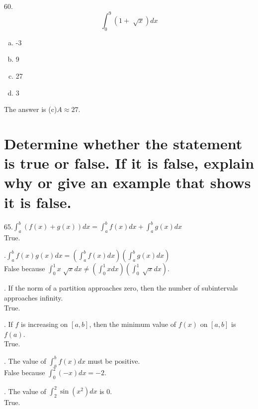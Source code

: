 \documentclass[11pt]{article}
\newcommand*{\vs}{\vspace{1cm}}
\newcommand*{\next}{\noindent}
\begin{document}
60.\[\int_{0}^{9}(1+\sqrt[]{x})dx\]
\begin{enumerate}[(a)]
    \item -3
    \item 9
    \item 27
    \item 3
\end{enumerate}
The answer is (c)$A\approx 27$.

\section{Determine whether the
statement is true or false. If it is false, explain why or give an
example that shows it is false.}
65.$\int_{a}^{b}(f(x)+g(x))dx=\int_{a}^{b}f(x)dx+\int_{a}^{b}g(x)dx$\\
\indent True.

\vs\next
66.$\int_{a}^{b}f(x)g(x)dx=\left(\int_{a}^{b}f(x)dx\right)\left(\int_{a}^{b}g(x)dx\right)$\\
\indent False because $\int_{0}^{1}x\sqrt[]{x}dx\neq\left(\int_{0}^{1}xdx\right)\left(\int_{0}^{1}\sqrt[]{x}dx\right)$.

\vs\next
67. If the norm of a partition approaches zero, then the number of
subintervals approaches infinity.\\
\indent True.

\vs\next
68. If $f$ is increasing on $[a, b]$, then the minimum value of $f(x)$ on $[a, b]$ is $f(a)$.\\
\indent True.

\vs\next
69. The value of $\int_{a}^{b}f(x)dx$ must be positive.\\
\indent False because $\int_{0}^{2}(-x)dx=-2$.

\vs\next
70. The value of $\int_{2}^{2}\sin(x^2)dx$ is 0.\\
\indent True.
\end{document}

